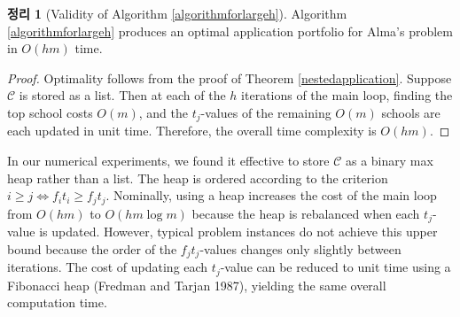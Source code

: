 \documentclass[12pt]{article} %
\newtheorem{theorem}{Theorem}
\newtheorem{proposition}{Proposition}
\theoremstyle{definition}
\newtheorem{theorem}{정리}
\newtheorem{proposition}{제의}
\theoremstyle{definition}
\begin{document}
\begin{theorem}[Validity of Algorithm \ref{algorithmforlargeh}]
Algorithm \ref{algorithmforlargeh} produces an optimal application portfolio for Alma's problem in $O(h m)$ time.
\end{theorem}
\begin{proof}
Optimality follows from the proof of Theorem \ref{nestedapplication}. Suppose $\mathcal{C}$ is stored as a list. Then at each of the $h$ iterations of the main loop, finding the top school costs $O(m)$, and the $t_j$-values of the remaining $O(m)$ schools are each updated in unit time. Therefore, the overall time complexity is $O(h m)$.
\end{proof}

In our numerical experiments, we found it effective to store $\mathcal{C}$ as a binary max heap rather than a list. The heap is ordered according to the criterion $i \geq j \iff f_i t_i \geq f_j t_j$. Nominally, using a heap increases the cost of the main loop from $O(h m)$ to $O(hm \log m)$ because the heap is rebalanced when each $t_j$-value is updated. However, typical problem instances do not achieve this upper bound because the order of the $f_j t_j$-values changes only slightly between iterations. The cost of updating each $t_j$-value can be reduced to unit time using a Fibonacci heap (Fredman and Tarjan 1987), yielding the same overall computation time. 
\end{document}
